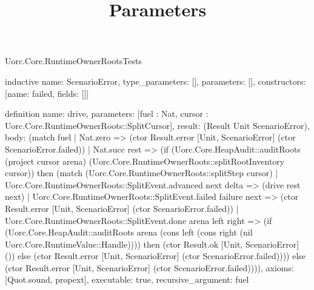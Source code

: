 \begin{lexlean}{Uorc.Core.RuntimeOwnerRootsTests}
\title{Parameters}
\begin{semanticmodule}
inductive{
  name: ScenarioError,
  type_parameters: [],
  parameters: [],
  constructors: [{name: failed, fields: []}]
}

definition{
  name: drive,
  parameters: [fuel : Nat, cursor : Uorc.Core.RuntimeOwnerRoots::SplitCursor],
  result: (Result Unit ScenarioError),
  body: (match fuel
    | Nat.zero => (ctor Result.error [Unit, ScenarioError] (ctor ScenarioError.failed))
    | Nat.succ rest => (if (Uorc.Core.HeapAudit::auditRoots (project cursor arena) (Uorc.Core.RuntimeOwnerRoots::splitRootInventory cursor)) then (match (Uorc.Core.RuntimeOwnerRoots::splitStep cursor)
      | Uorc.Core.RuntimeOwnerRoots::SplitEvent.advanced next delta => (drive rest next)
      | Uorc.Core.RuntimeOwnerRoots::SplitEvent.failed failure next => (ctor Result.error [Unit, ScenarioError] (ctor ScenarioError.failed))
      | Uorc.Core.RuntimeOwnerRoots::SplitEvent.done arena left right => (if (Uorc.Core.HeapAudit::auditRoots arena (cons left (cons right (nil Uorc.Core.RuntimeValue::Handle)))) then (ctor Result.ok [Unit, ScenarioError] ()) else (ctor Result.error [Unit, ScenarioError] (ctor ScenarioError.failed)))) else (ctor Result.error [Unit, ScenarioError] (ctor ScenarioError.failed)))),
  axioms: [Quot.sound, propext],
  executable: true,
  recursive_argument: fuel
}


\end{semanticmodule}
\end{lexlean}
